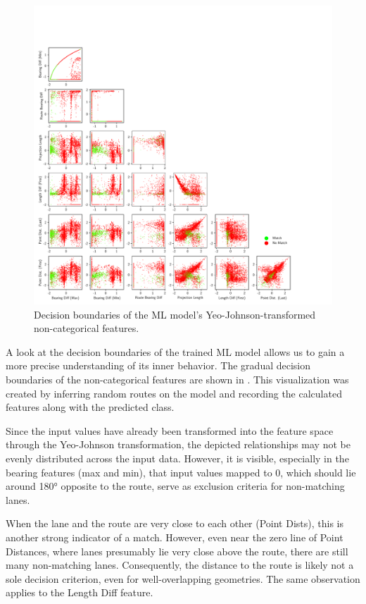 \begin{figure}[!t]
\centering 
\includegraphics[width=\linewidth,bb=0 0 760 760]{images/decision-boundaries.pdf}
\caption{Decision boundaries of the ML model's Yeo-Johnson-transformed non-categorical features.}
\label{fig:ml-model-decision-boundaries}
\end{figure}

A look at the decision boundaries of the trained ML model allows us to gain a more precise understanding of its inner behavior. The gradual decision boundaries of the non-categorical features are shown in . This visualization was created by inferring random routes on the model and recording the calculated features along with the predicted class. 

Since the input values have already been transformed into the feature space through the Yeo-Johnson transformation, the depicted relationships may not be evenly distributed across the input data. However, it is visible, especially in the bearing features (max and min), that input values mapped to 0, which should lie around 180° opposite to the route, serve as exclusion criteria for non-matching lanes.

When the lane and the route are very close to each other (Point Dists), this is another strong indicator of a match. However, even near the zero line of Point Distances, where lanes presumably lie very close above the route, there are still many non-matching lanes. Consequently, the distance to the route is likely not a sole decision criterion, even for well-overlapping geometries. The same observation applies to the Length Diff feature.

